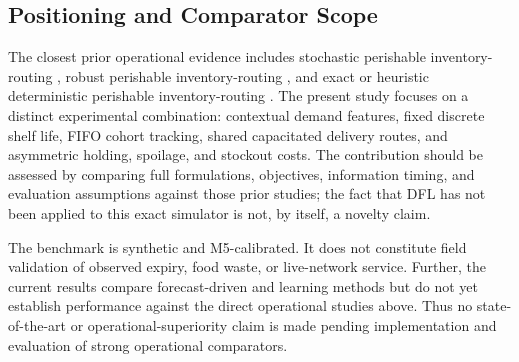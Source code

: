 \documentclass[11pt,a4paper]{article}
\theoremstyle{definition}
\theoremstyle{remark}
\begin{document}
\subsection{Positioning and Comparator Scope}
\label{subsec:lit_gap}

The closest prior operational evidence includes stochastic perishable inventory-routing \citep{archetti2018stochastic}, robust perishable inventory-routing \citep{he2024robust}, and exact or heuristic deterministic perishable inventory-routing \citep{coelho2014optimal,alvarez2020formulations}. The present study focuses on a distinct experimental combination: contextual demand features, fixed discrete shelf life, FIFO cohort tracking, shared capacitated delivery routes, and asymmetric holding, spoilage, and stockout costs. The contribution should be assessed by comparing full formulations, objectives, information timing, and evaluation assumptions against those prior studies; the fact that DFL has not been applied to this exact simulator is not, by itself, a novelty claim.

The benchmark is synthetic and M5-calibrated. It does not constitute field validation of observed expiry, food waste, or live-network service. Further, the current results compare forecast-driven and learning methods but do not yet establish performance against the direct operational studies above. Thus no state-of-the-art or operational-superiority claim is made pending implementation and evaluation of strong operational comparators.
\end{document}
